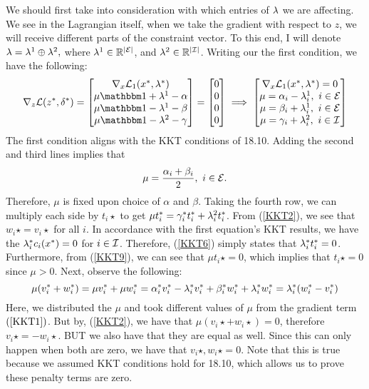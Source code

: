 \begin{solution}
    We should first take into consideration with which entries of $\mathrm{\lambda}$ we are affecting. We see in the Lagrangian itself, when we take the gradient with respect to $z$, we will receive different parts of the constraint vector. To this end, I will denote $\mathrm{\lambda} = \mathrm{\lambda}^1 \oplus \mathrm{\lambda}^2,$ where $\mathrm{\lambda}^1 \in \mathbb{R}^{|\mathcal{E}|}$, and $\mathrm{\lambda}^2 \in \mathbb{R}^{|\mathcal{I}|}$. Writing our the first condition, we have the following:
    \begin{align*}
        \grad_z\scL(z\star, \delta\star) = \mqty[\grad_x\scL_1(x\star, \lm\star)\\\mu\ind + \lm^1 - \alpha\\ \mu\ind - \lm^1 - \beta\\\mu\ind - \lm^2 - \gamma] = \mqty[0\\0\\0\\0] \implies \mqty[\grad_x\scL_1(x\star, \lm\star) = 0\\\mu = \alpha_i - \lm_i^1, \ i \in \scE\\ \mu = \beta_i + \lm_i^1, \ i \in \scE \\ \mu = \gamma_i + \lm^2_i, \ i \in \scI]
    \end{align*}
    The first condition aligns with the KKT conditions of 18.10. Adding the second and third lines implies that 
    \[\mu = \frac{\alpha_i + \beta_i}{2}, \ i \in \mathcal{E}.\]
    Therefore, $\mu$ is fixed upon choice of $\alpha$ and $\beta$. Taking the fourth row, we can multiply each side by $t_i\star$ to get $\mu t_i^{*} = \gamma_i^{*} t_i^{*} + \mathrm{\lambda}_i^2 t_i^{*}$. From (\ref{KKT2}), we see that $w_i\star = v_i\star$ for all $i$. In accordance with the first equation's KKT results, we have the $\mathrm{\lambda}_i^{*} c_i(x^{*}) = 0$ for $i \in \mathcal{I}$. Therefore, (\ref{KKT6}) simply states that $\mathrm{\lambda}_i^{*} t_i^{*} = 0$. Furthermore, from (\ref{KKT9}), we can see that $\mu t_i\star = 0$, which implies that $t_i\star = 0$ since $\mu > 0$. Next, observe the following:
    \[\mu(v_i^{*} + w_i^{*}) = \mu v_i^{*} + \mu w_i^{*} = \alpha_i^{*} v_i^{*} - \mathrm{\lambda}_i^{*} v_i^{*} + \beta_i^{*} w_i^{*} + \mathrm{\lambda}_i^{*} w_i^{*} = \mathrm{\lambda}_i^{*}(w_i^{*} - v_i^{*})\]
    Here, we distributed the $\mu$ and took different values of $\mu$ from the gradient term $(\ref{KKT1})$. But by, (\ref{KKT2}), we have that $\mu(v_i\star + w_i\star) = 0$, therefore $v_i\star = -w_i\star$. BUT we also have that they are equal as well. Since this can only happen when both are zero, we have that $v_i\star, w_i\star = 0$. Note that this is true because we assumed KKT conditions hold for 18.10, which allows us to prove these penalty terms are zero. 


\end{solution}
